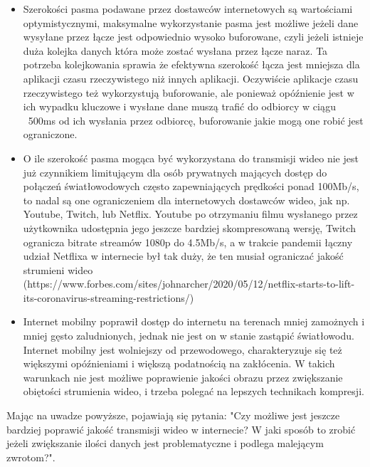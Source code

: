 \begin{itemize}
    \item Szerokości pasma podawane przez dostawców internetowych są wartościami optymistycznymi,
          maksymalne wykorzystanie pasma jest możliwe jeżeli dane wysyłane przez łącze jest
          odpowiednio wysoko buforowane, czyli jeżeli istnieje duża kolejka danych która może zostać
          wysłana przez łącze naraz. Ta potrzeba kolejkowania sprawia że efektywna szerokość łącza
          jest mniejsza dla aplikacji czasu rzeczywistego niż innych aplikacji. Oczywiście aplikacje
          czasu rzeczywistego też wykorzystują buforowanie, ale ponieważ opóźnienie jest w ich
          wypadku kluczowe i wysłane dane muszą trafić do odbiorcy w ciągu ~500ms od ich wysłania
          przez odbiorcę, buforowanie jakie mogą one robić jest ograniczone.
          
    \item O ile szerokość pasma mogąca być wykorzystana do transmisji wideo nie jest już czynnikiem
          limitującym dla osób prywatnych mających dostęp do połączeń światłowodowych często
          zapewniających prędkości ponad 100Mb/s, to nadal są one ograniczeniem dla internetowych
          dostawców wideo, jak np. Youtube, Twitch, lub Netflix. Youtube po otrzymaniu filmu
          wysłanego przez użytkownika udostępnia jego jeszcze bardziej skompresowaną wersję, Twitch
          ogranicza bitrate streamów 1080p do 4.5Mb/s, a w trakcie pandemii łączny udział Netflixa w
          internecie był tak duży, że ten musiał ograniczać jakość strumieni wideo
          (https://www.forbes.com/sites/johnarcher/2020/05/12/netflix-starts-to-lift-its-coronavirus-streaming-restrictions/)
          
    \item Internet mobilny poprawił dostęp do internetu na terenach mniej zamożnych i mniej gęsto
          zaludnionych, jednak nie jest on w stanie zastąpić światłowodu. Internet mobilny jest
          wolniejszy od przewodowego, charakteryzuje się też większymi opóźnieniami i większą podatnością
          na zakłócenia. W takich warunkach nie jest możliwe poprawienie jakości obrazu przez zwiększanie
          obiętości strumienia wideo, i trzeba polegać na lepszych technikach kompresji.
\end{itemize}

Mając na uwadze powyższe, pojawiają się pytania: "Czy możliwe jest jeszcze bardziej poprawić jakość transmisji
wideo w internecie? W jaki sposób to zrobić jeżeli zwiększanie ilości danych jest problematyczne i
podlega malejącym zwrotom?".

